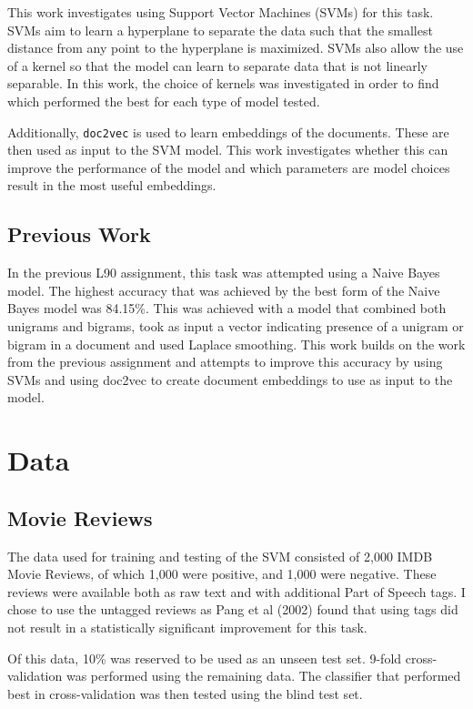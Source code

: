 \documentclass[twocolumn]{article}
\begin{document}
This work investigates using Support Vector Machines (SVMs) for this task. SVMs aim to learn a hyperplane to separate the data such that the smallest distance from any point to the hyperplane is maximized. SVMs also allow the use of a kernel so that the model can learn to separate data that is not linearly separable. In this work, the choice of kernels was investigated in order to find which performed the best for each type of model tested.

Additionally, \texttt{doc2vec} is used to learn embeddings of the documents. These are then used as input to the SVM model. This work investigates whether this can improve the performance of the model and which parameters are model choices result in the most useful embeddings.

\subsection{Previous Work}


In the previous L90 assignment, this task was attempted using a Naive Bayes model. The highest accuracy that was achieved by the best form of the Naive Bayes model was 84.15\%. This was achieved with a model that combined both unigrams and bigrams, took as input a vector indicating presence of a unigram or bigram in a document and used Laplace smoothing. This work builds on the work from the previous assignment and attempts to improve this accuracy by using SVMs and using doc2vec to create document embeddings to use as input to the model.

\section{Data}


\subsection{Movie Reviews}


The data used for training and testing of the SVM consisted of 2,000 IMDB Movie Reviews, of which 1,000 were positive, and 1,000 were negative. These reviews were available both as raw text and with additional Part of Speech tags. I chose to use the untagged reviews as Pang et al (2002) \cite{pang} found that using tags did not result in a statistically significant improvement for this task. 

Of this data, 10\% was reserved to be used as an unseen test set. 9-fold cross-validation was performed using the remaining data. The classifier that performed best in cross-validation was then tested using the blind test set.
\end{document}

